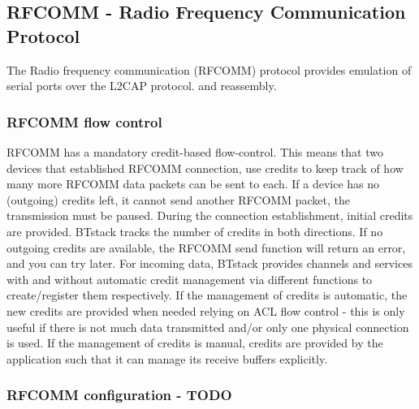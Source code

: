 \subsection{RFCOMM - Radio Frequency Communication Protocol}
The Radio frequency communication (RFCOMM) protocol provides emulation of serial ports over the L2CAP protocol.
and reassembly. 
\subsubsection{RFCOMM flow control}
\label{section:flowcontrol}
RFCOMM has a mandatory credit-based flow-control. This means that two devices that established RFCOMM connection, use credits to keep track of how many more RFCOMM data packets can be sent to each. If a device has no (outgoing) credits left, it cannot send another RFCOMM packet, the transmission must be paused. During the connection establishment, initial credits are provided. BTstack tracks the number of credits in both directions. If no outgoing credits are available, the RFCOMM send function will return an error, and you can try later. For incoming data, BTstack provides channels and services with and without automatic credit management via different functions to create/register them respectively. If the management of credits is automatic, the new credits are provided when needed relying on ACL flow control - this is only useful if there is not much data transmitted and/or only one physical connection is used. If the management of credits is manual, credits are provided by the application such that it can manage its receive buffers explicitly. 
\subsubsection{RFCOMM configuration - TODO}

